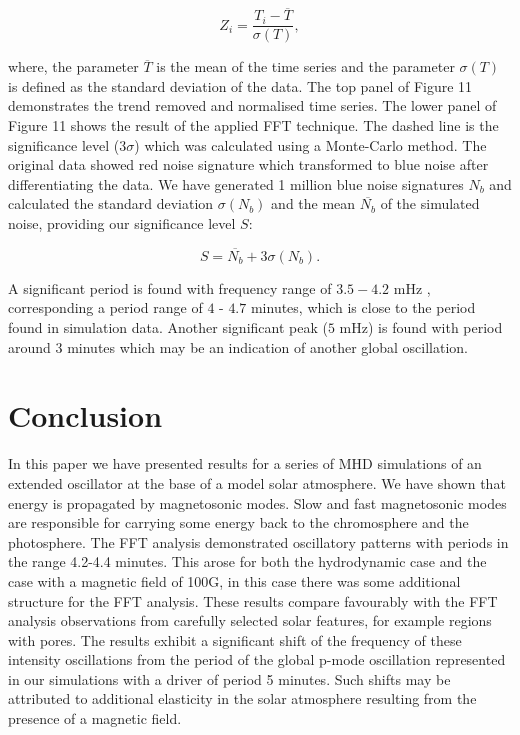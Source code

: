 \documentclass[linenumbers]{aastex63}
\begin{document}
\begin{equation}
	Z_{i} = \frac {T_{i} - \overline{T}}  {\sigma(T)},
	\label{z_score}
\end{equation}

where, the parameter $\overline{T}$ is the mean of the time series and the parameter $\sigma(T)$ is defined as the standard deviation of the data. The top panel of Figure 11 demonstrates the trend removed and normalised time series. The lower panel of Figure 11 shows the result of the applied FFT technique. The dashed line is the significance level ($3 \sigma$) which was calculated using a Monte-Carlo method. The original data showed red noise signature which transformed to blue noise after differentiating the data. We have generated 1 million blue noise signatures $N_{b}$ and calculated the standard deviation $\sigma(N_{b})$ and the mean $\overline{N_{b}}$ of the simulated noise, providing our significance level $S$:

\begin{equation}
    S = \overline{N_{b}} + 3 \sigma(N_{b}).
\end{equation}

A significant period is found with frequency range of $3.5-4.2$ mHz , corresponding a period range of $4$ - $4.7$ minutes, which is close to the period found in simulation data. Another significant peak ($5$ mHz) is found with period around $3$ minutes which may be an indication of another global oscillation.

\section{Conclusion}

In this paper we have presented results for a series of MHD simulations of an extended oscillator at the base of a model solar atmosphere. We have shown that energy is propagated by magnetosonic modes. Slow and fast magnetosonic modes are responsible for carrying some energy back to the chromosphere and the photosphere. 
The FFT analysis demonstrated oscillatory patterns with periods in the range 4.2-4.4 minutes. This arose for both the hydrodynamic case and the case with a magnetic field of 100G, in this case there was some additional structure for the FFT analysis. These results compare favourably with the FFT analysis observations from carefully selected solar features, for example regions with pores. The results exhibit a significant shift of the frequency of these intensity oscillations from the period of the global p-mode oscillation represented in our simulations with a driver of period 5 minutes. Such shifts may be attributed to additional elasticity in the solar atmosphere resulting from the presence of a magnetic field. 
\end{document}
